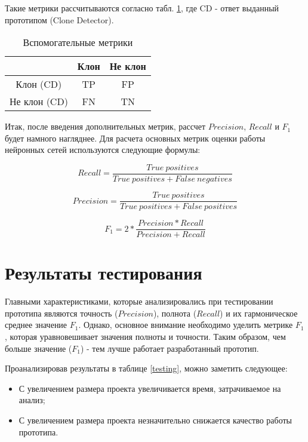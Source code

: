 Такие метрики рассчитываются согласно табл. \ref{truepos}, где CD - ответ выданный прототипом (Clone Detector).

\begin{table}[H]
\centering
\captionsetup{skip=5pt}
\caption{Вспомогательные метрики}
\label{truepos}
\begin{tabular}{c|c|c|}
\cline{2-3}
                                   & Клон & Не клон \\ \hline
\multicolumn{1}{|c|}{Клон (CD)}    & TP   & FP      \\ \hline
\multicolumn{1}{|c|}{Не клон (CD)} & FN   & TN      \\ \hline
\end{tabular}
\end{table}

Итак, после введения дополнительных метрик, рассчет \(Precision\), \(Recall\) и \(F_1\) будет намного нагляднее. Для расчета основных метрик оценки работы нейронных сетей используются следующие формулы:

\begin{equation}
\label{eq:recall}
Recall = \frac{True\ positives}{True\ positives + False\ negatives}
\end{equation}

\begin{equation}
\label{eq:precision}
Precision = \frac{True\ positives}{True\ positives + False\ positives}
\end{equation}

\begin{equation}
\label{eq:f1}
F_1 = 2*\frac{Precision * Recall}{Precision + Recall}
\end{equation}

\section{Результаты тестирования}

Главными характеристиками, которые анализировались при тестировании прототипа являются точность (\(Precision\)), полнота (\(Recall\)) и их гармоническое среднее значение \(F_1\). Однако, основное внимание необходимо уделить метрике \(F_1\), которая уравновешивает значения полноты и точности. Таким образом, чем больше значение (\(F_1\)) - тем лучше работает разработанный прототип.

Проанализировав результаты в таблице \ref{testing}, можно заметить следующее:
\begin{itemize}
\setlength\itemsep{0mm}
\item С увеличением размера проекта увеличивается время, затрачиваемое на анализ;
\item С увеличением размера проекта незначительно снижается качество работы прототипа.
\end{itemize}

